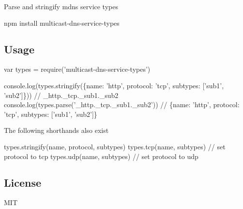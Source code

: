 Parse and stringify mdns service types


\begin{DoxyCode}
npm install multicast-dns-service-types
\end{DoxyCode}


\href{http://travis-ci.org/mafintosh/multicast-dns-service-types}{\tt }

\subsection*{Usage}


\begin{DoxyCode}
var types = require('multicast-dns-service-types')

console.log(types.stringify(\{name: 'http', protocol: 'tcp', subtypes: ['sub1', 'sub2']\})) //
       \_http.\_tcp.\_sub1.\_sub2
console.log(types.parse('\_http.\_tcp.\_sub1.\_sub2')) // \{name: 'http', protocol: 'tcp', subtypes: ['sub1',
       'sub2']\}
\end{DoxyCode}


The following shorthands also exist


\begin{DoxyCode}
types.stringify(name, protocol, subtypes)
types.tcp(name, subtypes) // set protocol to tcp
types.udp(name, subtypes) // set protocol to udp
\end{DoxyCode}


\subsection*{License}

M\+IT 